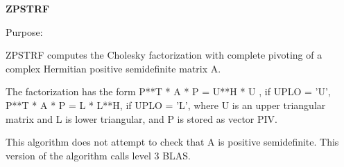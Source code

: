 {\bfseries Z\+P\+S\+T\+R\+F} 

 \begin{DoxyParagraph}{Purpose\+: }
\begin{DoxyVerb} ZPSTRF computes the Cholesky factorization with complete
 pivoting of a complex Hermitian positive semidefinite matrix A.

 The factorization has the form
    P**T * A * P = U**H * U ,  if UPLO = 'U',
    P**T * A * P = L  * L**H,  if UPLO = 'L',
 where U is an upper triangular matrix and L is lower triangular, and
 P is stored as vector PIV.

 This algorithm does not attempt to check that A is positive
 semidefinite. This version of the algorithm calls level 3 BLAS.\end{DoxyVerb}
 
\end{DoxyParagraph}

